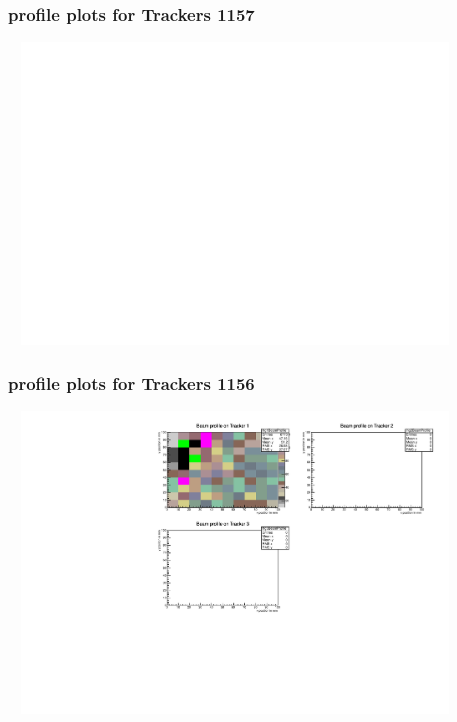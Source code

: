 \documentclass[slidestop,compress,mathserif]{beamer}
\begin{document}
\begin{frame}\frametitle{profile plots for Trackers 1157}
	 \includegraphics[width=12cm,height=8cm]{profile_plots_for_Trackers_1157.pdf}
\end{frame}
\begin{frame}\frametitle{profile plots for Trackers 1156}
	 \includegraphics[width=12cm,height=8cm]{profile_plots_for_Trackers_1156.pdf}
\end{frame}
\end{document}
